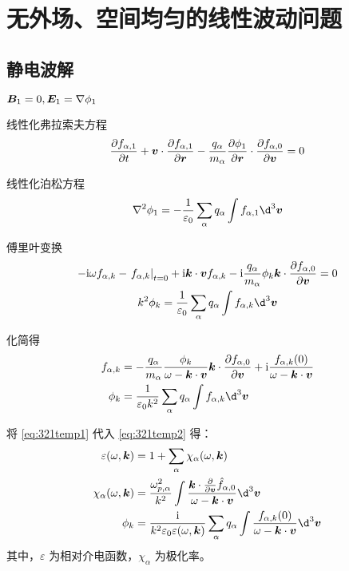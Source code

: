 
\chapter{无外场、空间均匀的线性波动问题}

\section{静电波解 \label{section:321}}

$\bm{B}_1=0,\bm{E}_1=\nabla {\phi_1} $

线性化弗拉索夫方程
\begin{equation}
\pdv{f_{\alpha,1}}{t} + \bm{v} \cdot \pdv{f_{\alpha,1}}{\bm{r}}
- \frac{q_\alpha}{m_\alpha} \pdv{\phi_1}{\bm{r}} \cdot \pdv{f_{\alpha,0}}{\bm{v}}
= 0
\end{equation}

线性化泊松方程
\begin{equation}
\laplace{\phi_1} = - \frac{1}{\varepsilon_0} \sum_\alpha q_\alpha \int f_{\alpha,1} \d^3 \vector{v}
\end{equation}

傅里叶变换
\begin{subequations}\begin{gather}
-\im\omega f_{\alpha,k} - \left.f_{\alpha,k}\right|_{t=0} + \im \vector{k} \cdot \vector{v} f_{\alpha,k}
- \im \frac{q_\alpha}{m_\alpha} \phi_k \vector{k} \cdot \pdv{f_{\alpha,0}}{\vector{v}}
= 0 \\
k^2 \phi_k = \frac{1}{\varepsilon_0} \sum_\alpha q_\alpha \int f_{\alpha,k} \d^3 \vector{v}
\end{gather}\end{subequations}

化简得
\begin{subequations}\begin{align}
f_{\alpha,k} &= - \frac{q_\alpha}{m_\alpha} \frac{\phi_k}{\omega - \vector{k} \cdot \vector{v}} \vector{k} \cdot \pdv{f_{\alpha,0}}{\vector{v}}
+ \im \frac{f_{\alpha,k}(0)}{\omega - \vector{k} \cdot \vector{v}} \label{eq:321temp1} \\
\phi_k &= \frac{1}{\varepsilon_0 k^2} \sum_\alpha q_\alpha \int f_{\alpha,k} \d^3 \vector{v} \label{eq:321temp2}
\end{align}\end{subequations}

将 \ref{eq:321temp1} 代入 \ref{eq:321temp2} 得：
\begin{subequations}\begin{align}
\varepsilon(\omega, \vector{k}) &= 1 + \sum_\alpha \chi_\alpha(\omega, \vector{k}) \label{eq:321varepsilon}\\
\chi_\alpha(\omega, \vector{k}) &= \frac{\omega_{p,\alpha}^2}{k^2}
\int \frac{\vector{k} \cdot \pdv{}{\vector{v}} \hat{f}_{\alpha,0}}{\omega - \vector{k} \cdot \vector{v}} \d^3 \vector{v} \label{eq:321chi}\\
\phi_k &= \frac{\im}{k^2 \varepsilon_0 \varepsilon(\omega, \vector{k})} \sum_\alpha q_\alpha \int \frac{f_{\alpha,k}(0)}{\omega - \vector{k} \cdot \vector{v}} \d^3 \vector{v}
\end{align}\end{subequations}
其中，$\varepsilon$ 为相对介电函数，$\chi_\alpha$ 为极化率。

